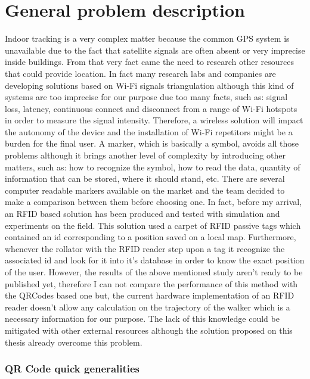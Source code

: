 \chapter{General problem description}

Indoor tracking is a very complex matter because the common GPS system is unavailable due to the fact that satellite signals are often absent or very imprecise inside buildings.
From that very fact came the need to research other resources that could provide location.
In fact many research labs and companies are developing solutions based on Wi-Fi signals triangulation although this kind of systems are too imprecise for our purpose due too many facts, such as: signal loss, latency, continuous connect and disconnect from a range of Wi-Fi hotspots in order to measure the signal intensity.
Therefore, a wireless solution will impact the autonomy of the device and the installation of Wi-Fi repetitors might be a burden for the final user.
\newline
A marker, which is basically a symbol, avoids all those problems although it brings another level of complexity by introducing other matters, such as: how to recognize the symbol, how to read the data, quantity of information that can be stored, where it should stand, etc.
There are several computer readable markers available on the market and the team decided to make a comparison between them before choosing one.
In fact, before my arrival, an RFID based solution has been produced and tested with simulation and experiments on the field.
This solution used a carpet of RFID passive tags which contained an id corresponding to a position saved on a local map. Furthermore, whenever the rollator with the RFID reader step upon a tag it recognize the associated id and look for it into it's database in order to know the exact position of the user. However, the results of the above mentioned study aren't ready to be published yet, therefore I can not compare the performance of this method with the QRCodes based one but, the current hardware implementation of an RFID reader doesn't allow any calculation on the trajectory of the walker which is a necessary information for our purpose.
The lack of this knowledge could be mitigated with other external resources although the solution proposed on this thesis already overcome this problem. 




\subsection{QR Code quick generalities}

